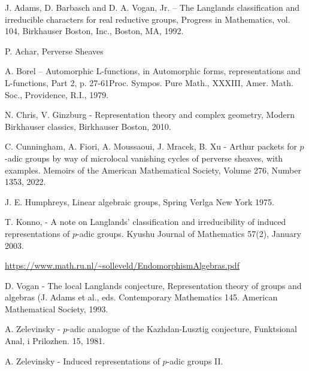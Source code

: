 \documentclass{memoir}
\theoremstyle{definition}
\begin{document}
	
		\begin{thebibliography}{2}
		
		 J. Adams, D. Barbasch and D. A. Vogan, Jr. – The Langlands classification
		and irreducible characters for real reductive groups, Progress in Mathematics, vol. 104,
		Birkhauser Boston, Inc., Boston, MA, 1992.
		
		 P. Achar, Perverse Sheaves
		
		 A. Borel – Automorphic L-functions, in Automorphic forms, representations and
		L-functions, Part
		2, p. 27-61Proc. Sympos. Pure Math., XXXIII, Amer. Math. Soc., Providence, R.I., 1979. 
		
		 N. Chris, V. Ginzburg
		-
		Representation theory and complex geometry, Modern Birkhauser classics, Birkhauser Boston, 2010.
		
		 C. Cunningham, A. Fiori, A. Moussaoui, J. Mracek,  B. Xu - Arthur packets for $p$-adic groups by way of microlocal vanishing cycles of perverse sheaves, with examples. Memoirs of the American Mathematical Society, Volume 276, Number 1353, 2022.
		
		 J. E. Humphreys, Linear algebraic groups, Spring Verlga New York 1975.
		
		 T. Konno, - A note on Langlands’ classification and irreducibility of induced representations of $p$-adic groups. Kyushu Journal of Mathematics 57(2), January 2003. 
		
		 \url{https://www.math.ru.nl/~solleveld/EndomorphismAlgebras.pdf}
		
		 D. Vogan - The local Langlands conjecture, Representation theory of groups and algebras (J. Adams et al., eds. Contemporary Mathematics 145. American Mathematical Society, 1993.
		
		 A. Zelevinsky - $p$-adic analogue of the Kazhdan-Lusztig conjecture, Funktsional Anal, i Prilozhen.
		15, 1981.
		
		 A. Zelevinsky - Induced representations of $p$-adic groups II.  
	\end{thebibliography}
	
\end{document}
